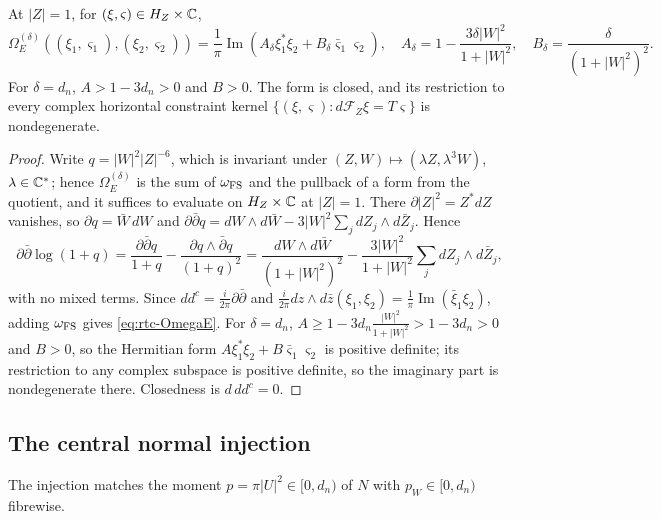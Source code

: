 \begin{lemma}\label{lem:rtc-kahler}
At $|Z|=1$, for $(\xi,\varsigma)\in H_Z\times\mathbb{C}$,
\begin{equation}\label{eq:rtc-OmegaE}
 \Omega_E^{(\delta)}((\xi_1,\varsigma_1),(\xi_2,\varsigma_2))
 =\frac1\pi\operatorname{Im}(A_\delta\xi_1^*\xi_2+B_\delta\bar\varsigma_1\varsigma_2),\quad
 A_\delta=1-\frac{3\delta|W|^2}{1+|W|^2},\quad B_\delta=\frac{\delta}{(1+|W|^2)^2}.
\end{equation}
For $\delta=d_n$, $A>1-3d_n>0$ and $B>0$.
The form is closed, and its restriction to every complex horizontal constraint kernel
$\{(\xi,\varsigma):d\mathcal F_Z\xi=T\varsigma\}$ is nondegenerate.
\end{lemma}
\begin{proof}
Write $q=|W|^2|Z|^{-6}$, which is invariant under $(Z,W)\mapsto(\lambda Z,\lambda^3W)$, $\lambda\in\mathbb{C}^*$; hence
$\Omega_E^{(\delta)}$ is the sum of $\omega_{\rm FS}$ and the pullback of a form from the quotient, and it suffices to evaluate on
$H_Z\times\mathbb{C}$ at $|Z|=1$. There $\partial|Z|^2=Z^*dZ$ vanishes, so $\partial q=\bar W\,dW$ and
$\partial\bar\partial q=dW\wedge d\bar W-3|W|^2\sum_jdZ_j\wedge d\bar Z_j$. Hence
\[
 \partial\bar\partial\log(1+q)=\frac{\partial\bar\partial q}{1+q}-\frac{\partial q\wedge\bar\partial q}{(1+q)^2}
 =\frac{dW\wedge d\bar W}{(1+|W|^2)^2}-\frac{3|W|^2}{1+|W|^2}\sum_jdZ_j\wedge d\bar Z_j ,
\]
with no mixed terms. Since $dd^c=\frac i{2\pi}\partial\bar\partial$ and $\frac i{2\pi}dz\wedge d\bar z(\xi_1,\xi_2)=\frac1\pi\operatorname{Im}(\bar\xi_1\xi_2)$, adding
$\omega_{\rm FS}$ gives \eqref{eq:rtc-OmegaE}. For $\delta=d_n$, $A\ge1-3d_n\frac{|W|^2}{1+|W|^2}>1-3d_n>0$ and $B>0$, so the
Hermitian form $A\xi_1^*\xi_2+B\bar\varsigma_1\varsigma_2$ is positive definite; its restriction to any complex subspace is
positive definite, so the imaginary part is nondegenerate there. Closedness is $d\,dd^c=0$.
\end{proof}


\subsection{The central normal injection}\label{sec:rtc-injection}

The injection matches the moment $p=\pi|U|^2\in[0,d_n)$ of $N$ with $p_W\in[0,d_n)$ fibrewise.


